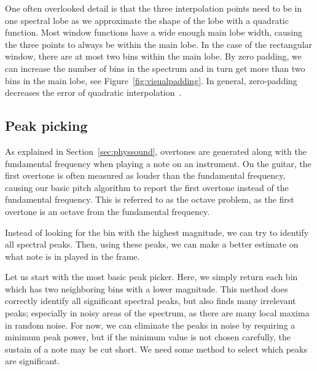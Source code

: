 \documentclass[a4paper,10pt,twocolumn]{article}
\begin{document}
One often overlooked detail is that the three interpolation points need to be in one spectral lobe as we approximate the shape of the lobe with a quadratic function. Most window functions have a wide enough main lobe width, causing the three points to always be within the main lobe. In the case of the rectangular window, there are at most two bins within the main lobe. By zero padding, we can increase the number of bins in the spectrum and in turn get more than two bins in the main lobe, see Figure~\ref{fig:visualpadding}. In general, zero-padding decreases the error of quadratic interpolation~\cite{interpolnozero}.


\subsection{Peak picking}
As explained in Section~\ref{sec:physsound}, overtones are generated along with the fundamental frequency when playing a note on an instrument. On the guitar, the first overtone is often measured as louder than the fundamental frequency, causing our basic pitch algorithm to report the first overtone instead of the fundamental frequency. This is referred to as the octave problem, as the first overtone is an octave from the fundamental frequency.

Instead of looking for the bin with the highest magnitude, we can try to identify all spectral peaks. Then, using these peaks, we can make a better estimate on what note is in played in the frame.

Let us start with the most basic peak picker. Here, we simply return each bin which has two neighboring bins with a lower magnitude. This method does correctly identify all significant spectral peaks, but also finds many irrelevant peaks; especially in noisy areas of the spectrum, as there are many local maxima in random noise. For now, we can eliminate the peaks in noise by requiring a minimum peak power, but if the minimum value is not chosen carefully, the sustain of a note may be cut short. We need some method to select which peaks are significant.
\end{document}
